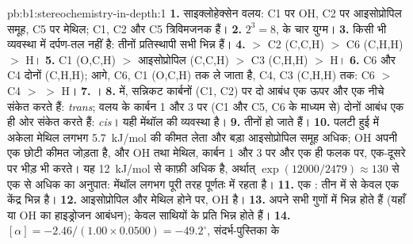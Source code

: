 \begin{solution}{pb:b1:stereochemistry-in-depth:1}
\textbf{1.} साइक्लोहेक्सेन वलय: C1 पर OH, C2 पर आइसोप्रोपिल समूह, C5 पर
मेथिल; C1, C2 और C5 त्रिविमजनक हैं।
\textbf{2.} $2^3 = 8$,  के चार युग्म।
\textbf{3.} किसी भी व्यवस्था में दर्पण-तल नहीं है: तीनों प्रतिस्थापी
सभी भिन्न हैं।
\textbf{4.}  $>$ C2 (C,C,H) $>$ C6 (C,H,H) $>$ H।
\textbf{5.} C1 (O,C,H) $>$ आइसोप्रोपिल (C,C,H) $>$ C3 (C,H,H) $>$ H।
\textbf{6.} C6 और C4 दोनों (C,H,H); आगे, C6, C1 (O,C,H) तक ले जाता है, C4, C3
(C,H,H) तक: C6 $>$ C4 $>$  $>$ H।
\textbf{7.} ।
\textbf{8.}  में, सन्निकट कार्बनों (C1, C2) पर दो  आबंध
एक ऊपर और एक नीचे संकेत करते हैं: \textit{trans}; वलय के कार्बन 1 और 3 पर
(C1 और C5, C6 के माध्यम से) दोनों  आबंध एक ही ओर संकेत करते हैं:
\textit{cis}। यही मेंथॉल की व्यवस्था है।
\textbf{9.} तीनों  हो जाते हैं।
\textbf{10.} पलटी हुई  में अकेला मेथिल लगभग
\qty{5.7}{kJ/mol} की कीमत लेता और बड़ा आइसोप्रोपिल समूह अधिक; OH अपनी एक छोटी
कीमत जोड़ता है, और  OH तथा मेथिल, कार्बन 1 और 3 पर और
एक ही फलक पर, एक-दूसरे पर भीड़ भी करते। यह \qty{12}{kJ/mol} से काफ़ी अधिक है,
अर्थात् $\exp(12000/2479) \approx 130$ से एक से अधिक का अनुपात: मेंथॉल
लगभग पूरी तरह पूर्णतः   में रहता है।
\textbf{11.} एक : तीन में से केवल एक केंद्र भिन्न है।
\textbf{12.} आइसोप्रोपिल और मेथिल  होने पर, OH  है।
\textbf{13.}  अपने सभी गुणों में भिन्न होते हैं (यहाँ
 या  OH का हाइड्रोजन आबंधन);  केवल
 साथियों के प्रति भिन्न होते हैं।
\textbf{14.} $[\alpha] = -2.46/(1.00 \times 0.0500) = -49.2^\circ$, संदर्भ-पुस्तिका के

\end{solution}
